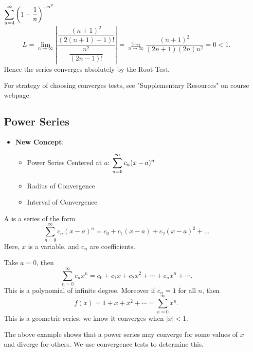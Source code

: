 \begin{ex}
    $\displaystyle\sum_{n=4}^\infty \left(1+\dfrac{1}{n} \right)^{-n^2}$ 
    \[ L = \lim_{n\to \infty} \left| \dfrac{\dfrac{(n+1)^2}{(2(n+1)-1)!}}{\dfrac{n^2}{(2n-1)!}}\right| = \lim_{n\to \infty} \dfrac{(n+1)^2}{(2n+1)(2n) n^2} = 0 < 1.\]
    Hence the series converges absolutely by the Root Test. 
\end{ex}
For strategy of choosing converges tests, see "Supplementary Resources" on course webpage.


\subsection{Power Series} 
\begin{center}
\begin{tcolorbox}
    \begin{itemize}
        \item \textbf{New Concept}: 
        \begin{itemize}
            \item Power Series Centered at $a$: $\displaystyle\sum_{n=0}^\infty c_n (x-a)^n$
            \item Radius of Convergence 
            \item Interval of Convergence
        \end{itemize}
    \end{itemize}
\end{tcolorbox}
\end{center}
\begin{defn}
    A  is a series of the form
    \[\sum_{n=0}^\infty c_n (x-a)^n = c_0 + c_1 (x-a) + c_2 (x-a)^2 + \dots\]
    Here, $x$ is a variable, and $c_n$ are coefficients.
\end{defn}

\begin{ex}
    Take $a=0$, then 
    \[\sum_{n=0}^\infty c_n x^n = c_0 + c_1 x + c_2 x^2 + \cdots + c_n x^n + \cdots.\]
    This is a polynomial of infinite degree.
    Moreover if $c_n = 1$ for all $n$, then 
    \[f(x) = 1 + x + x^2 + \cdots = \sum_{n=0}^\infty x^n.\]
    This is a geometric series, we know it converges when $|x|<1$.
\end{ex}

The above example shows that a power series may converge for some values of $x$ and diverge for others. We use convergence tests to determine this.


